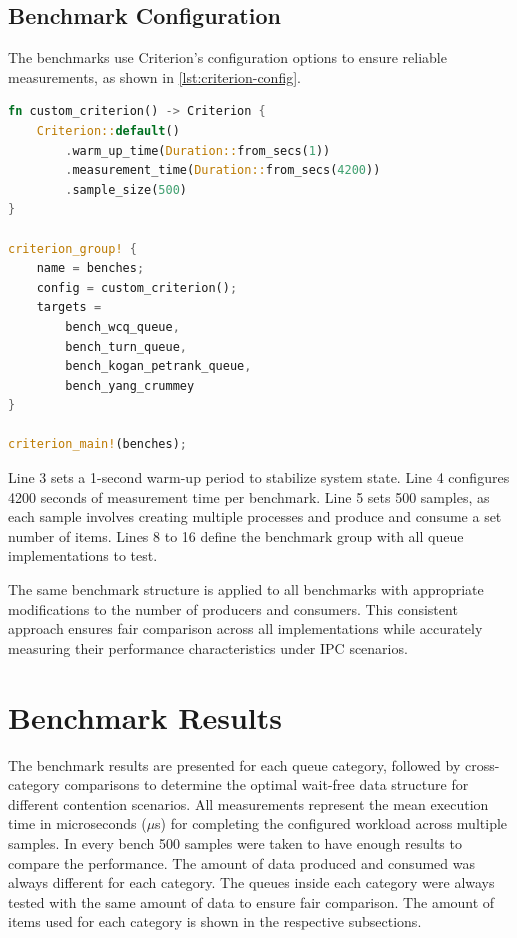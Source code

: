 \subsection{Benchmark Configuration}
The benchmarks use Criterion's configuration options to ensure reliable measurements, as shown in \cref{lst:criterion-config}.

\begin{lstlisting}[language=Rust, style=boxed, caption={Criterion benchmark configuration}, label={lst:criterion-config}]
fn custom_criterion() -> Criterion {
    Criterion::default()
        .warm_up_time(Duration::from_secs(1))
        .measurement_time(Duration::from_secs(4200))
        .sample_size(500)
}

criterion_group! {
    name = benches;
    config = custom_criterion();
    targets =
        bench_wcq_queue,
        bench_turn_queue,
        bench_kogan_petrank_queue,
        bench_yang_crummey
}

criterion_main!(benches);
\end{lstlisting}

Line 3 sets a 1-second warm-up period to stabilize system state. Line 4 configures 4200 seconds of measurement time per benchmark. Line 5 sets 500 samples, as each sample involves creating multiple processes and produce and consume a set number of items. Lines 8 to 16 define the benchmark group with all queue implementations to test.

The same benchmark structure is applied to all benchmarks with appropriate modifications to the number of producers and consumers. This consistent approach ensures fair comparison across all implementations while accurately measuring their performance characteristics under \ac{IPC} scenarios.

\section{Benchmark Results}
The benchmark results are presented for each queue category, followed by cross-category comparisons to determine the optimal wait-free data structure for different contention scenarios. All measurements represent the mean execution time in microseconds ($\mu$s) for completing the configured workload across multiple samples. In every bench 500 samples were taken to have enough results to compare the performance. The amount of data produced and consumed was always different for each category. The queues inside each category were always tested with the same amount of data to ensure fair comparison. The amount of items used for each category is shown in the respective subsections.

